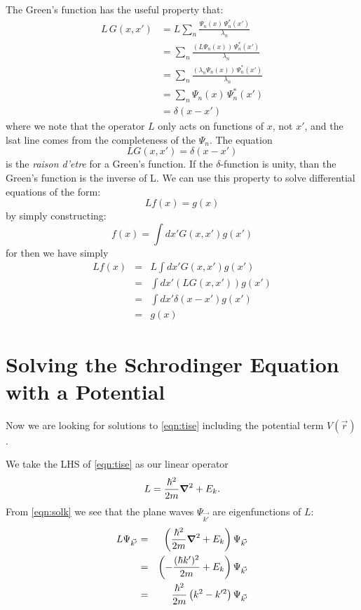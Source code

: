 \documentclass[12pt]{article}
\begin{document}
The Green's function has the useful property that:
\begin{displaymath}
\begin{split}
L \, G(x,x') & = L \sum_n \frac{\Psi_n(x) \, \Psi^*_n(x')}{\lambda_n}\\
& = \sum_n \frac{ \left( L \Psi_n(x) \right) \, \Psi^*_n(x')}{\lambda_n}\\
& = \sum_n \frac{ \left( \lambda_n \Psi_n(x) \right) \, \Psi^*_n(x')}{\lambda_n}\\
& = \sum_n \Psi_n(x) \, \Psi^*_n(x')\\
& = \delta(x-x')
\end{split}
\end{displaymath}
where we note that the operator $L$ only acts on functions of $x$, not $x'$, and the lsat line comes from the completeness of the $\Psi_n$.  The equation
\begin{equation} \label{eqn:greendelta}
L G(x,x') = \delta(x-x')
\end{equation}
is the {\it raison d'etre} for a Green's function.  If the $\delta$-function is
unity, than the Green's function is the inverse of L.  We can use this property
to solve differential equations of the form:
\begin{equation}
L f(x) = g(x)
\end{equation}
by simply constructing:
\begin{equation}
f(x) = \int dx' G(x,x') g(x')
\end{equation}
for then we have simply
\begin{eqnarray*}
L f(x) &=& L \int dx' G(x,x') g(x')\\
&=& \int dx' \left(L G(x,x')\right) g(x')\\
&=& \int dx' \delta(x-x') g(x')\\
&=& g(x)
\end{eqnarray*}

\section{Solving the Schrodinger Equation with a Potential}

Now we are looking for solutions to \eqref{eqn:tise} including the potential
term $V(\vec{r})$.  

We take the LHS of \eqref{eqn:tise} as our linear operator
\begin{displaymath}
L = \frac{\hbar^2}{2m} \mbox{\boldmath$ \nabla $} ^2 + E_k.
\end{displaymath}
From \eqref{eqn:solk} we see that the plane waves $\Psi_{\vec{k'}}$ are eigenfunctions of $L$:
\begin{eqnarray*}
L \Psi_{\vec{k'}} 
&=& \left( \frac{\hbar^2}{2m} \mbox{\boldmath$ \nabla $} ^2 + E_k \right) \Psi_{\vec{k'}}\\
&=& \left( -\frac{(\hbar k')^2}{2m} + E_k \right) \Psi_{\vec{k'}}\\
&=& \frac{\hbar^2}{2m}\left( k^2 - k'^2 \right) \Psi_{\vec{k'}}
\end{eqnarray*}
\end{document}
